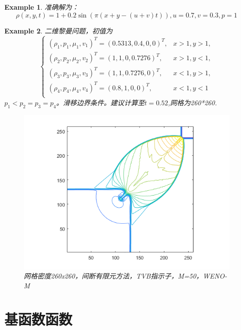 \documentclass{article}
\newtheorem{example}{Example}
\numberwithin{equation}{subsection}    %
\begin{document}
\begin{appendix}
\begin{example}
        准确解为：
        \begin{equation}
            \rho(x,y,t) = 1+0.2\sin(\pi(x+y-(u+v)t)),u=0.7,v=0.3,p=1
        \end{equation}
    \end{example}
    \begin{example}
        二维黎曼问题\cite{RN13}，初值为
        \begin{equation}
            \begin{cases}
                \left(\rho_{1}, p_{1}, \mu_{1}, v_{1}\right)^{T}=(0.5313,0.4,0,0)^{T}, & x>1, y>1, \\
                \left(\rho_{2}, p_{2}, \mu_{2}, v_{2}\right)^{T}=(1,1,0,0.7276)^{T},   & x>1, y<1, \\
                \left(\rho_{3}, p_{3}, \mu_{3}, v_{3}\right)^{T}=(1,1,0.7276,0)^{T},   & x<1, y>1, \\
                \left(\rho_{4}, p_{4}, \mu_{4}, v_{4}\right)^{T}=(0.8,1,0,0)^{T},      & x<1, y<1  \\
            \end{cases}
        \end{equation}
        $p_1<p_2=p_3=p_4$。滑移边界条件。建议计算至$t=0.52$,网格为260*260.
        \begin{figure}[htp]
            \centering
            \label{fig:}
            \includegraphics[width=0.7\linewidth]{fig/二维黎曼问题}
            \caption{网格密度260x260，间断有限元方法，TVB指示子，M=50，WENO-M}
        \end{figure}


    \end{example}
    \newpage
    \section{基函数函数}
    \cite{RN48}

\end{appendix}
\end{document}
